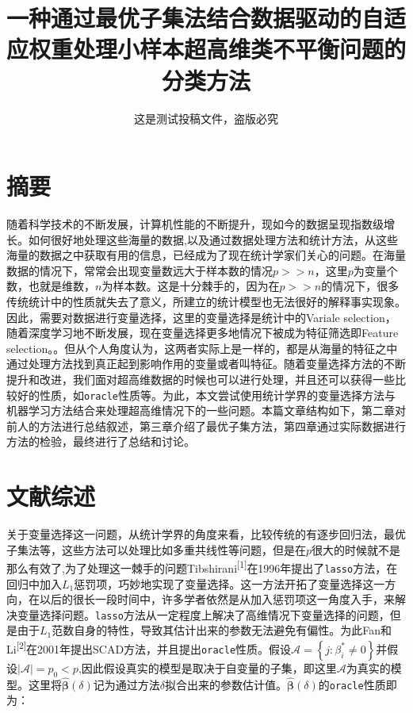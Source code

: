 \documentclass[
]{ctexart}
\title{一种通过最优子集法结合数据驱动的自适应权重处理小样本超高维类不平衡问题的分类方法}
\author{这是测试投稿文件，盗版必究}
\date{}
\newcommand{\passthrough}[1]{#1}
\begin{document}
\maketitle

{
\setcounter{tocdepth}{2}
\tableofcontents
}
\parindent=19pt

\hypertarget{ux6458ux8981}{%
\section{摘要}\label{ux6458ux8981}}

随着科学技术的不断发展，计算机性能的不断提升，现如今的数据呈现指数级增长。如何很好地处理这些海量的数据,以及通过数据处理方法和统计方法，从这些海量的数据之中获取有用的信息，已经成为了现在统计学家们关心的问题。在海量数据的情况下，常常会出现变量数远大于样本数的情况\(p >> n\)，这里\(p\)为变量个数，也就是维数，\(n\)为样本数。这是十分棘手的，因为在\(p >> n\)的情况下，很多传统统计中的性质就失去了意义，所建立的统计模型也无法很好的解释事实现象。因此，需要对数据进行变量选择，这里的变量选择是统计中的Variale
selection，随着深度学习地不断发展，现在变量选择更多地情况下被成为特征筛选即Feature
selection。。但从个人角度认为，这两者实际上是一样的，都是从海量的特征之中通过处理方法找到真正起到影响作用的变量或者叫特征。随着变量选择方法的不断提升和改进，我们面对超高维数据的时候也可以进行处理，并且还可以获得一些比较好的性质，如\passthrough{\lstinline!oracle!}性质等。为此，本文尝试使用统计学界的变量选择方法与机器学习方法结合来处理超高维情况下的一些问题。本篇文章结构如下，第二章对前人的方法进行总结叙述，第三章介绍了最优子集方法，第四章通过实际数据进行方法的检验，最终进行了总结和讨论。

\hypertarget{ux6587ux732eux7efcux8ff0}{%
\section{文献综述}\label{ux6587ux732eux7efcux8ff0}}

关于变量选择这一问题，从统计学界的角度来看，比较传统的有逐步回归法，最优子集法等，这些方法可以处理比如多重共线性等问题，但是在\(p\)很大的时候就不是那么有效了,为了处理这一棘手的问题Tibshirani\textsuperscript{{[}1{]}}在1996年提出了\passthrough{\lstinline!lasso!}方法，在回归中加入\(L_1\)惩罚项，巧妙地实现了变量选择。这一方法开拓了变量选择这一方向，在以后的很长一段时间中，许多学者依然是从加入惩罚项这一角度入手，来解决变量选择问题。\passthrough{\lstinline!lasso!}方法从一定程度上解决了高维情况下变量选择的问题，但是由于\(L_1\)范数自身的特性，导致其估计出来的参数无法避免有偏性。为此Fan和Li\textsuperscript{{[}2{]}}在2001年提出SCAD方法，并且提出\passthrough{\lstinline!oracle!}性质。假设\(\mathcal{A}=\left\{j: \beta_{i}^{*} \neq 0\right\}\)并假设\(|\mathcal{A}|=p_{0}<p\),因此假设真实的模型是取决于自变量的子集，即这里\(\mathcal{A}\)为真实的模型。这里将\(\hat{\boldsymbol{\beta}}(\delta)\)记为通过方法\(\delta\)拟合出来的参数估计值。\(\hat{\boldsymbol{\beta}}(\delta)\)的\passthrough{\lstinline!oracle!}性质即为：
\end{document}
